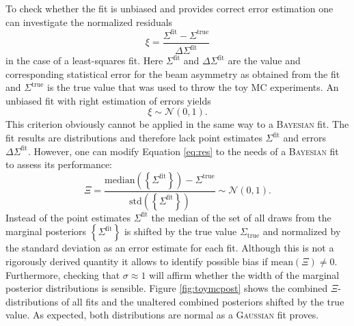 \noindent To check whether the fit is unbiased and provides correct error estimation one can investigate the normalized residuals
\begin{equation}
	\xi = \frac{\Sigma^\text{fit}-\Sigma^\text{true}}{\Delta\Sigma^\text{fit}}
	\label{eq:res}
\end{equation}
 in the case of a least-squares fit. Here $\Sigma^\text{fit}$ and $\Delta\Sigma^\text{fit}$ are the value and corresponding statistical error for the beam asymmetry as obtained from the fit and $\Sigma^\text{true}$ is the true value that was used to throw the toy MC experiments. An unbiased fit with right estimation of errors yields \cite{statistics} \begin{equation}
	\xi\sim\mathcal{N}\left(0,1\right).
	\label{eq:xi}
\end{equation}
This criterion obviously cannot be applied in the same way to a \textsc{Bayesian} fit. The fit results are distributions and therefore lack point estimates $\Sigma^\text{fit}$ and errors $\Delta\Sigma^\text{fit}$. However, one can modify Equation \eqref{eq:res} to the needs of a \textsc{Bayesian} fit to assess its performance:
\begin{equation}
	\Xi=\frac{\text{median}\left(\left\{\Sigma^\text{fit}\right\}\right)-\Sigma^\text{true}}{\text{std}\left(\left\{\Sigma^\text{fit}\right\}\right)}\sim\mathcal{N}(0,1).
\end{equation}
Instead of the point estimates $\Sigma^\text{fit}$ the median of the set of all draws from the marginal posteriors $\left\{\Sigma^\text{fit}\right\}$ is shifted by the true value $\Sigma_\text{true}$ and normalized by the standard deviation as an error estimate for each fit. Although this is not a rigorously derived quantity it allows to identify possible bias if $\text{mean}\left(\Xi\right)\neq 0$. Furthermore, checking that $\sigma\approx1$ will affirm whether the width of the marginal posterior distributions is sensible. Figure \ref{fig:toymcpost} shows the combined $\Xi$-distributions of all fits and the unaltered combined posteriors shifted by the true value. As expected, both distributions are normal as a \textsc{Gaussian} fit proves.  
